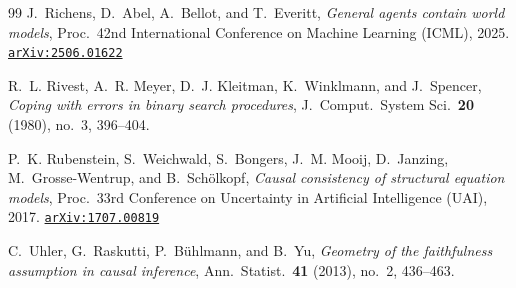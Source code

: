 \documentclass[11pt]{amsart}
\newcommand{\arxiv}[1]{\href{https://arxiv.org/abs/#1}{\texttt{arXiv:#1}}}
\theoremstyle{plain}
\theoremstyle{definition}
\begin{document}
\begin{thebibliography}{99}
J.~Richens, D.~Abel, A.~Bellot, and T.~Everitt,
\emph{General agents contain world models},
Proc.\ 42nd International Conference on Machine Learning (ICML), 2025. \arxiv{2506.01622}

R.~L. Rivest, A.~R. Meyer, D.~J. Kleitman, K.~Winklmann, and J.~Spencer,
\emph{Coping with errors in binary search procedures},
J.\ Comput.\ System Sci.\ \textbf{20} (1980), no.~3, 396--404.

P.~K. Rubenstein, S.~Weichwald, S.~Bongers, J.~M. Mooij, D.~Janzing, M.~Grosse-Wentrup, and B.~Sch\"olkopf,
\emph{Causal consistency of structural equation models},
Proc.\ 33rd Conference on Uncertainty in Artificial Intelligence (UAI), 2017. \arxiv{1707.00819}

C.~Uhler, G.~Raskutti, P.~B\"uhlmann, and B.~Yu,
\emph{Geometry of the faithfulness assumption in causal inference},
Ann.\ Statist.\ \textbf{41} (2013), no.~2, 436--463.

\end{thebibliography}
\end{document}
